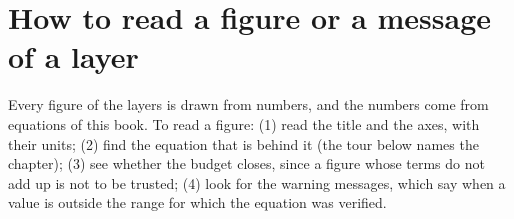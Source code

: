 \section{How to read a figure or a message of a layer}
Every figure of the layers is drawn from numbers, and the numbers come from equations of this book. To read a figure: (1) read the title and the axes, with their units; (2) find the equation that is behind it (the tour below names the chapter); (3) see whether the budget closes, since a figure whose terms do not add up is not to be trusted; (4) look for the warning messages, which say when a value is outside the range for which the equation was verified.
